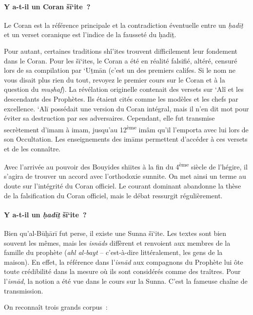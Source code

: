  
\paragraph{{Y a-t-il un Coran šī`ite~?
}}\label{y-a-t-il-un-coran-ux161ux12bite}

Le Coran est la référence principale et la contradiction éventuelle
entre un \emph{ḥadīṯ} et un verset coranique est l'indice de la fausseté
du ḥadīṯ.

Pour autant, certaines traditions shî'ites trouvent difficilement leur
fondement dans le Coran. Pour les šī`ites, le Coran a été en réalité
falsifié, altéré, censuré lors de sa compilation par `Uṯmān (c'est un
des premiers califes. Si le nom ne vous disait plus rien du tout,
revoyez le premier cours sur le Coran et à la question du
\emph{muṣhaf}). La révélation originelle contenait des versets sur `Alî
et les descendants des Prophètes. Ils étaient cités comme les modèles et
les chefs par excellence. `Alī possédait une version du Coran intégral,
mais il n'en dit mot pour éviter sa destruction par ses adversaires.
Cependant, elle fut transmise secrètement d'imam à imam, jusqu'au
12\textsuperscript{ème} imâm qu'il l'emporta avec lui lors de son
Occultation. Les enseignements des imāms permettent d'accéder à ces
versets et de les connaître.

Avec l'arrivée au pouvoir des Bouyides shiites à la fin du
4\textsuperscript{ème} siècle de l'hégire, il s'agira de trouver un
accord avec l'orthodoxie sunnite. On met ainsi un terme au doute sur
l'intégrité du Coran officiel. Le courant dominant abandonne la thèse de
la falsification du Coran officiel, mais le débat ressurgit
régulièrement.

 
\paragraph{Y a-t-il un \emph{ḥadīṯ} šī`ite~?
} 

Bien qu'al-Būḫārī fut perse, il existe une Sunna šī`ite. Les textes sont
bien souvent les mêmes, mais les \emph{isnāds} diffèrent et renvoient
aux membres de la famille du prophète (\emph{ahl al-bayt} --
c'est-à-dire littéralement, les gens de la maison). En effet, la
référence dans l'\emph{isnād} aux compagnons du Prophète lui ôte toute
crédibilité dans la mesure où ils sont considérés comme des traîtres.
Pour l'\emph{isnād}, la notion a été vue dans le cours sur la Sunna.
C'est la fameuse chaîne de transmission.

On reconnaît trois grands corpus~:

